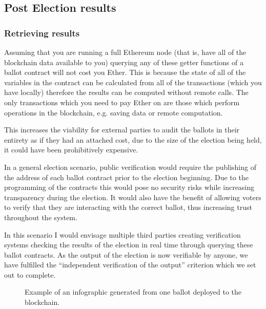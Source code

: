\documentclass{article}
\begin{document}
\cleardoublepage
\subsection{Post Election results}
\subsubsection{Retrieving results}
Assuming that you are running a full Ethereum node (that is, have all of the blockchain data available to you) querying any of these getter functions of a ballot contract will not cost you Ether. This is because the state of all of the variables in the contract can be calculated from all of the transactions (which you have locally) therefore the results can be computed without remote calls. The only transactions which you need to pay Ether on are those which perform operations in the blockchain, e.g. saving data or remote computation.

This increases the viability for external parties to audit the ballots in their entirety as if they had an attached cost, due to the size of the election being held, it could have been prohibitively expensive. 

In a general election scenario, public verification would require the publishing of the address of each ballot contract prior to the election beginning. Due to the programming of the contracts this would pose no security risks while increasing transparency during the election. It would also have the benefit of allowing voters to verify that they are interacting with the correct ballot, thus increasing trust throughout the system.

In this scenario I would envisage multiple third parties creating verification systems checking the results of the election in real time through querying these ballot contracts. As the output of the election is now verifiable by anyone, we have fulfilled the ``independent verification of the output'' criterion which we set out to complete.

\begin{figure}[h]
	\noindent
	\caption{Example of an infographic generated from one ballot deployed to the blockchain.}
\end{figure}



\end{document}
